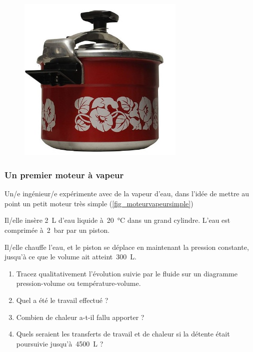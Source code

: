 	\begin{figure}[htp] %
		\begin{center}
			\includegraphics[width=8cm, max width=0.7\columnwidth]{images/exercice_super_cocotte}
		\end{center}
		\label{fig_cocotte}
	\end{figure}


\subsubsection{Un premier moteur à vapeur}
\label{exo_moteur_basique_vapeur}

	Un/e ingénieur/e expérimente avec de la vapeur d’eau, dans l’idée de mettre au point un petit moteur très simple (\cref{fig_moteurvapeursimple})
	
	Il/elle insère \SI{2}{\liter} d’eau liquide à~\SI{20}{\degreeCelsius} dans un grand cylindre. L’eau est comprimée à~\SI{2}{\bar} par un piston.
	
	Il/elle chauffe l’eau, et le piston se déplace en maintenant la pression constante, jusqu’à ce que le volume ait atteint~\SI{300}{\liter}.
	
	\begin{enumerate}
		\item Tracez qualitativement l’évolution suivie par le fluide sur un diagramme pression-volume ou température-volume.
		\item Quel a été le travail effectué ?
		\item Combien de chaleur a-t-il fallu apporter ?
		\item Quels seraient les transferts de travail et de chaleur si la détente était poursuivie jusqu’à~\SI{4500}{\liter} ?
	\end{enumerate}

